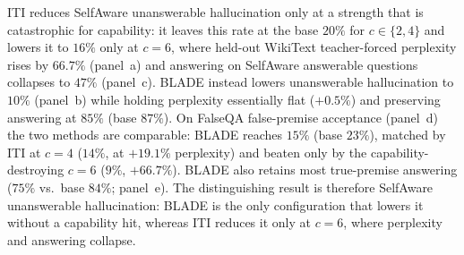 ITI reduces SelfAware unanswerable hallucination only at a strength that is catastrophic
for capability: it leaves this rate at the base $20\%$ for $c\!\in\!\{2,4\}$ and
lowers it to $16\%$ only at $c\!=\!6$, where held-out WikiText teacher-forced perplexity rises by
$66.7\%$ (panel~a) and answering on SelfAware answerable questions collapses to $47\%$
(panel~c). BLADE instead lowers unanswerable hallucination to $10\%$ (panel~b) while
holding perplexity essentially flat ($+0.5\%$) and preserving answering at $85\%$
(base $87\%$). On FalseQA false-premise acceptance (panel~d) the two methods are
comparable: BLADE reaches $15\%$ (base $23\%$), matched by ITI at $c\!=\!4$
($14\%$, at $+19.1\%$ perplexity) and beaten only by the capability-destroying
$c\!=\!6$ ($9\%$, $+66.7\%$). BLADE also retains most true-premise answering ($75\%$ vs.\ base
$84\%$; panel~e). The distinguishing result is therefore SelfAware unanswerable
hallucination: BLADE is the only configuration that lowers it without a capability hit,
whereas ITI reduces it only at $c\!=\!6$, where perplexity and answering collapse.
